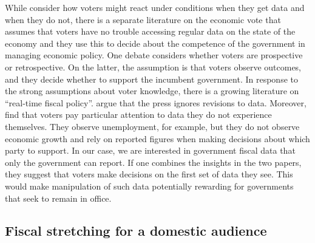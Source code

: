 \documentclass[]{article}
\begin{document}
While \cite{Hollyer2014} consider how voters might react under conditions when they get data and when they do not, there is a separate literature on the economic vote that assumes that voters have no trouble accessing regular data on the state of the economy and they use this to decide about the competence of the government in managing economic policy. One debate considers whether voters are prospective or retrospective. On the latter, the assumption is that voters observe outcomes, and they decide whether to support the incumbent government. In response to the strong assumptions about voter knowledge, there is a growing literature on ``real-time fiscal policy''. \cite{KayserLeininger2015} argue that the press ignores revisions to data. Moreover, \cite{kayser_peress} find that voters pay particular attention to data they do not experience themselves. They observe unemployment, for example, but they do not observe economic growth and rely on reported figures when making decisions about which party to support. In our case, we are interested in government fiscal data that only the government can report. If one combines the insights in the two papers, they suggest that voters make decisions on the first set of data they see. This would make manipulation of such data potentially rewarding for governments that seek to remain in office.

\subsection{Fiscal stretching for a domestic audience}
\end{document}
